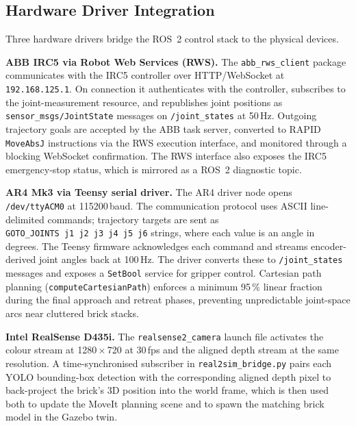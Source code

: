 \subsection{Hardware Driver Integration}
\label{subsec:ch6_drivers}

Three hardware drivers bridge the ROS~2 control stack to the physical devices.

\textbf{ABB IRC5 via Robot Web Services (RWS).} The \texttt{abb\_rws\_client} package communicates with the IRC5 controller over HTTP/WebSocket
at \texttt{192.168.125.1}.  On connection it authenticates with the controller, subscribes to
the joint-measurement resource, and republishes joint positions as \texttt{sensor\_msgs/JointState}
messages on \texttt{/joint\_states} at 50\,Hz.  Outgoing trajectory goals are accepted by the
ABB task server, converted to RAPID \texttt{MoveAbsJ} instructions via the RWS execution
interface, and monitored through a blocking WebSocket confirmation.  The RWS interface also
exposes the IRC5 emergency-stop status, which is mirrored as a ROS~2 diagnostic topic.

\textbf{AR4 Mk3 via Teensy serial driver.} The AR4 driver node opens \texttt{/dev/ttyACM0} at 115200\,baud.  The communication protocol
uses ASCII line-delimited commands; trajectory targets are sent as
\texttt{GOTO\_JOINTS~j1~j2~j3~j4~j5~j6} strings, where each value is an angle in degrees.
The Teensy firmware acknowledges each command and streams encoder-derived joint angles back at
100\,Hz.  The driver converts these to \texttt{/joint\_states} messages and exposes a
\texttt{SetBool} service for gripper control.  Cartesian path planning
(\texttt{computeCartesianPath}) enforces a minimum 95\,\% linear fraction during the final
approach and retreat phases, preventing unpredictable joint-space arcs near cluttered brick
stacks.

\textbf{Intel RealSense D435i.} The \texttt{realsense2\_camera} launch file activates the colour stream at 1280\,$\times$\,720
at 30\,fps and the aligned depth stream at the same resolution.  A time-synchronised subscriber
in \texttt{real2sim\_bridge.py} pairs each YOLO bounding-box detection with the corresponding
aligned depth pixel to back-project the brick's 3D position into the world frame, which is then
used both to update the MoveIt planning scene and to spawn the matching brick model in the
Gazebo twin.

